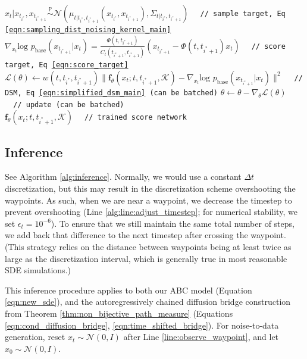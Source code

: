 \documentclass{article}
\begin{document}
\begin{algorithm}
\begin{algorithmic}[1]
    \State $x_t | x_{t_{i^*}}, x_{t_{i^*+1}} \overset{\mathbb{P}}{\sim} \mathcal{N}(\mu_{t | t_{i^*}, t_{i^*+1}}(x_{t_{i^*}}, x_{t_{i^*+1}}), \Sigma_{t | t_{i^*}, t_{i^*+1}})$ \texttt{\ \ // sample target, Eq \ref{eqn:sampling_dist_noising_kernel_main}}
    \State $\nabla_{x_t} \text{log } p_\text{base}(x_{t_{i^*+1}} | x_t) = \frac{\Phi(t, t_{i^*+1})}{C_t(t_{i^*+1}, t_{i^*+1})}(x_{t_{i^*+1}} - \Phi(t, t_{i^*+1})x_{t})$ \texttt{\ \ // score target, Eq \ref{eqn:score_target}}
    \State $\mathcal{L}(\theta) \gets w(t, t_{i^*}, t_{i^*+1})\|\mathbf{f}_\theta(x_t; t, t_{i^*+1}, \mathcal{K}) - \nabla_{x_t} \text{log } p_\text{base}(x_{t_{i^*+1}} | x_t)\|^2$ \texttt{\ \ // DSM, Eq \ref{eqn:simplified_dsm_main} (can be batched)}
    \State $\theta \gets \theta - \nabla_{\theta}\mathcal{L}(\theta)$ \texttt{\ \ // update (can be batched)}
\EndFor
\\
\Return $\mathbf{f}_\theta(x_t; t, t_{i^*+1}, \mathcal{K})$ \texttt{\ \ // trained score network}
\end{algorithmic}
\end{algorithm}

\subsection{Inference}
See Algorithm \ref{alg:inference}.
Normally, we would use a constant $\Delta t$ discretization, but this may result in the discretization scheme overshooting the waypoints. As such, when we are near a waypoint, we decrease the timestep to prevent overshooting (Line \ref{alg:line:adjust_timestep}; for numerical stability, we set $\epsilon_t = 10^{-6}$). To ensure that we still maintain the same total number of steps, we add back that difference to the next timestep after crossing the waypoint. (This strategy relies on the distance between waypoints being at least twice as large as the discretization interval, which is generally true in most reasonable SDE simulations.)

This inference procedure applies to both our ABC model (Equation \ref{eqn:new_sde}), and the autoregressively chained diffusion bridge construction from Theorem \ref{thm:non_bijective_path_measure} (Equations \ref{eqn:cond_diffusion_bridge}, \ref{eqn:time_shifted_bridge}).
For noise-to-data generation, reset $x_t \sim \mathcal{N}(0, I)$ after Line \ref{line:observe_waypoint}, and let $x_0 \sim \mathcal{N}(0, I)$.
\end{document}
